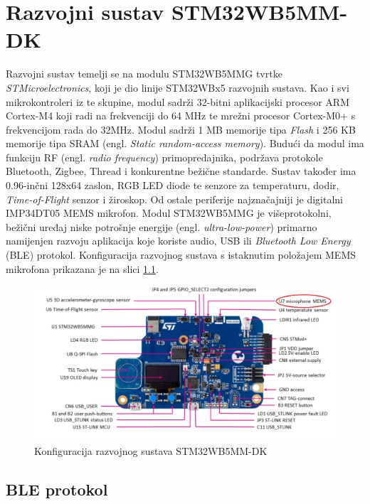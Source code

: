 \chapter{Razvojni sustav STM32WB5MM-DK}

Razvojni sustav temelji se na modulu STM32WB5MMG tvrtke \textit{STMicroelectronics}, koji je dio linije STM32WBx5 razvojnih sustava. Kao i svi mikrokontroleri iz te skupine, modul sadrži 32-bitni aplikacijski procesor ARM Cortex-M4 koji radi na frekvenciji do 64 MHz te mrežni procesor Cortex-M0+ s frekvencijom rada do 32MHz. Modul sadrži 1 MB memorije tipa \textit{Flash} i 256 KB memorije tipa SRAM (engl. \textit{Static random-access memory}).\cite{stm32manual} Budući da modul ima funkciju RF (engl. \textit{radio frequency}) primopredajnika, podržava protokole Bluetooth, Zigbee, Thread i konkurentne bežične standarde. Sustav također ima 0.96-inčni 128x64 zaslon, RGB LED diode te senzore za temperaturu, dodir, \textit{Time-of-Flight} senzor i žiroskop. Od ostale periferije najznačajniji je digitalni IMP34DT05 MEMS mikrofon. Modul STM32WB5MMG je višeprotokolni, bežični uređaj niske potrošnje energije (engl. \textit{ultra-low-power}) primarno namijenjen razvoju aplikacija koje koriste audio, USB ili \textit{Bluetooth Low Energy} (BLE) protokol. Konfiguracija razvojnog sustava s istaknutim položajem MEMS mikrofona prikazana je na slici \ref{fig:discovery-kit}.

\begin{figure}[ht]
	\includegraphics[scale=0.5]{imgs/discovery_kit}
	\caption{Konfiguracija razvojnog sustava STM32WB5MM-DK \cite{stm32manual}}
	\label{fig:discovery-kit}
\end{figure}

\section{BLE protokol}

